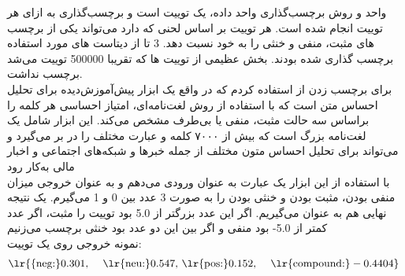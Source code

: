 \Section
{واحد و روش برچسب‌گذاری}
{
	واحد داده، یک توییت است و برچسب‌گذاری به ازای هر توییت انجام شده است.
	\newline هر توییت بر اساس لحنی که دارد می‌تواند یکی از برچسب های مثبت، منفی و خنثی را به خود نسبت دهد. 
	3
	تا از دیتاست های مورد استفاده برچسب گذاری شده بودند. بخش عظیمی از توییت ها که تقریبا 500000
	توییت می‌شد برچسب نداشت. 
	\\ برای برچسب زدن از 
	استفاده کردم که
	در واقع  یک ابزار پیش‌آموزش‌دیده برای تحلیل احساس متن است که با استفاده از روش لغت‌نامه‌ای، امتیاز احساسی هر کلمه را براساس سه حالت مثبت، منفی یا بی‌طرف مشخص می‌کند. این ابزار شامل یک لغت‌نامه بزرگ است که بیش از ۷۰۰۰ کلمه و عبارت مختلف را در بر می‌گیرد و می‌تواند برای تحلیل احساس متون مختلف از جمله خبرها و شبکه‌های اجتماعی و اخبار مالی به‌کار رود
	\\با استفاده از این ابزار یک عبارت به عنوان ورودی می‌دهم و به عنوان خروجی میزان منفی بودن، مثبت بودن و خنثی بودن را به صورت 3 عدد بین 0 و 1 می‌گیرم. یک نتیجه نهایی هم به عنوان  می‌گیریم.
	اگر این عدد بزرگتر از 5.0 بود توییت را مثبت، اگر عدد کمتر از 5.0- بود منفی و اگر بین این دو عدد بود خنثی برچسب می‌زنیم
	\\ نمونه خروجی روی یک توییت:
	\begin{equation*}
		\begin{aligned}
			& \text{\lr{\{neg:}} 0.301, \
			& \text{\lr{neu:}} 0.547, \
			& \text{\lr{pos:}} 0.152, \
			& \text{\lr{compound:}} -0.4404\} \
		\end{aligned}
	\end{equation*}
}

